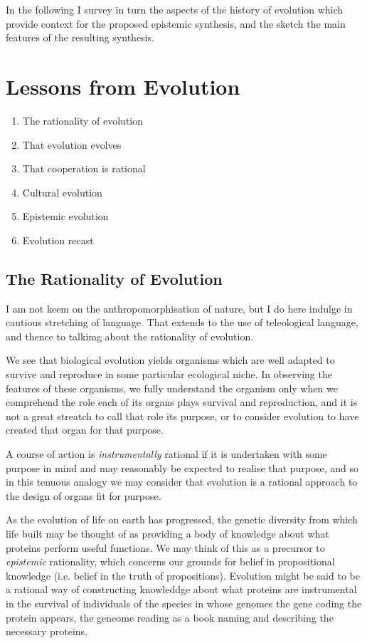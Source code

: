 In the following I survey in turn the aspects of the history of evolution which provide context for the proposed epistemic synthesis, and the sketch the main features of the resulting synthesis.

\section{Lessons from Evolution}

\begin{enumerate}
\item The rationality of evolution
\item That evolution evolves
\item That cooperation is rational
\item Cultural evolution
\item Epistemic evolution
\item Evolution recast
\end{enumerate}

\subsection{The Rationality of Evolution}

I am not keem on the anthropomorphisation of nature, but I do here indulge in cautious stretching of language.
That extends to the use of teleological language, and thence to talkimg about the rationality of evolution.

We see that biological evolution yields organisms which are well adapted to survive and reproduce in some particular ecological niche.
In observing the features of these organisms, we fully understand the organism only when we comprehend the role each of its organs plays survival and reproduction, and it is not a great streatch to call that role its purpose, or to consider evolution to have created that organ for that purpose.

A course of action is \emph{instrumentally} rational if it is undertaken with some purpose in mind and may reasonably be expected to realise that purpose, and so in this tenuous analogy we may consider that evolution is a rational approach to the design of organs fit for purpose.

As the evolution of life on earth has progressed, the genetic diversity from which life built may be thought of as providing a body of knowledge about what proteins perform useful functions.
We may think of this as a precursor to \emph{epistemic} rationality, which concerns our grounds for belief in propositional knowledge (i.e. belief in the truth of propositions).
Evolution might be said to be a rational way of constructing knowleddge about what proteins are instrumental in the survival of individuals of the species in whose genomes the gene coding the protein appears, the geneome reading as a book naming and describing the necessary proteins.

